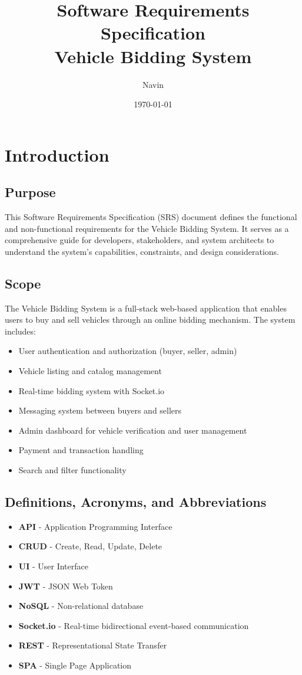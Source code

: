 \documentclass[12pt,a4paper]{report}
\begin{document}
\title{Software Requirements Specification \\ Vehicle Bidding System}
\author{Navin}
\date{\today}
\maketitle

\tableofcontents
\newpage

\chapter{Introduction}
\section{Purpose}
This Software Requirements Specification (SRS) document defines the functional and non-functional requirements for the Vehicle Bidding System. It serves as a comprehensive guide for developers, stakeholders, and system architects to understand the system's capabilities, constraints, and design considerations.

\section{Scope}
The Vehicle Bidding System is a full-stack web-based application that enables users to buy and sell vehicles through an online bidding mechanism. The system includes:
\begin{itemize}
    \item User authentication and authorization (buyer, seller, admin)
    \item Vehicle listing and catalog management
    \item Real-time bidding system with Socket.io
    \item Messaging system between buyers and sellers
    \item Admin dashboard for vehicle verification and user management
    \item Payment and transaction handling
    \item Search and filter functionality
\end{itemize}

\section{Definitions, Acronyms, and Abbreviations}
\begin{itemize}
    \item \textbf{API} - Application Programming Interface
    \item \textbf{CRUD} - Create, Read, Update, Delete
    \item \textbf{UI} - User Interface
    \item \textbf{JWT} - JSON Web Token
    \item \textbf{NoSQL} - Non-relational database
    \item \textbf{Socket.io} - Real-time bidirectional event-based communication
    \item \textbf{REST} - Representational State Transfer
    \item \textbf{SPA} - Single Page Application
\end{itemize}
\end{document}
